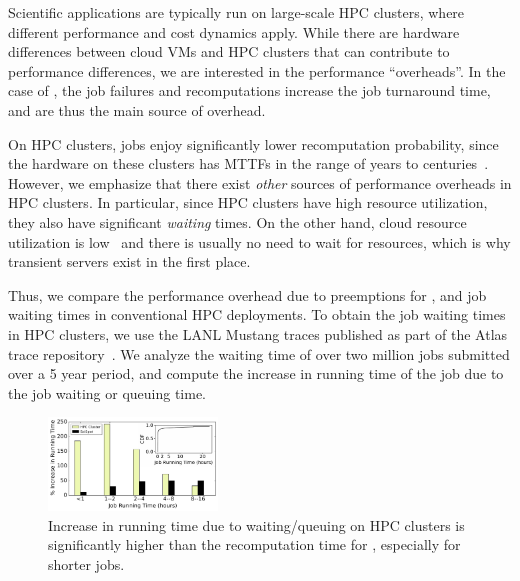 Scientific applications are typically run on large-scale HPC clusters, where different performance and cost dynamics apply.
While there are hardware differences between cloud VMs and HPC clusters that can contribute to performance differences, we are interested in the performance ``overheads''.
In the case of \sysname, the job failures and recomputations increase the job turnaround time, and are thus the main source of overhead.

On HPC clusters, jobs enjoy significantly lower recomputation probability, since the hardware on these clusters has MTTFs in the range of years to centuries~\cite{dongarra-ckpting}.
However, we emphasize that there exist \emph{other} sources of performance overheads in HPC clusters.
In particular, since HPC clusters have high resource utilization, they also have significant \emph{waiting} times. 
On the other hand, cloud resource utilization is low~\cite{borg} and there is usually no need to wait for resources, which is why transient servers exist in the first place. 


Thus, we compare the performance overhead due to preemptions for \sysname, and job waiting times in conventional HPC deployments.
To obtain the job waiting times in HPC clusters, we use the LANL Mustang traces published as part of the Atlas trace repository~\cite{cmu-atlas}.
We analyze the waiting time of over two million jobs submitted over a 5 year period, and compute the increase in running time of the job due to the job waiting or queuing time. 

\begin{figure}[t]
  \centering 
  \includegraphics[width=0.4\textwidth]{../graphs/hpc-vs-scispot.pdf}
      \vspace*{\myfigspace}
  \caption{Increase in running time due to waiting/queuing on HPC clusters is significantly higher than the recomputation time for \sysname, especially for shorter jobs. }
  \label{fig:hpc-vs-scispot}
  \vspace*{\myfigspace}
\end{figure}


